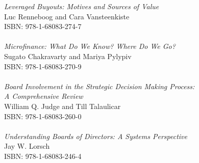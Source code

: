 \vspace{12pt}
\noindent \textit{Leveraged Buyouts: Motives and Sources of Value}\\
Luc Renneboog and Cara Vansteenkiste
\\ISBN: 978-1-68083-274-7
\\
\\
\noindent \textit{Microfinance: What Do We Know? Where Do We Go?}\\
Sugato Chakravarty and Mariya Pylypiv
\\ISBN: 978-1-68083-270-9
\\
\\
\noindent \textit{Board Involvement in the Strategic Decision Making Process:\\ A Comprehensive Review}\\
William Q. Judge and Till Talaulicar
\\ISBN: 978-1-68083-260-0
\\
\\
\noindent \textit{Understanding Boards of Directors: A Systems Perspective}\\
Jay W. Lorsch
\\ISBN: 978-1-68083-246-4
